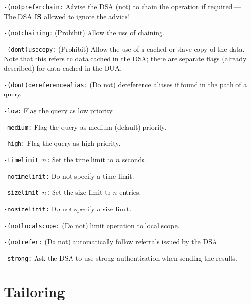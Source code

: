 \begin{describe}

\item [\tt -(no)preferchain\rm :] Advise the DSA (not) to chain the operation if
required --- The DSA {\bf IS} allowed to ignore the advice!

\item [\tt -(no)chaining\rm :] (Prohibit) Allow the use of chaining.

\item [\tt -(dont)usecopy\rm :] (Prohibit) Allow the use of a cached or slave 
copy of the data.  
Note that this refers to data cached in the DSA; there are separate flags
(already described)
for data cached in the DUA.

\item [\tt -(dont)dereferencealias\rm :] (Do not) dereference aliases if found in
the path of a query.

\item [\tt -low\rm :] Flag the query as low priority.
\item [\tt -medium\rm :] Flag the query as medium (default) priority.
\item [\tt -high\rm :]  Flag the query as high priority.

\item [\tt -timelimit $n$\rm :] Set the time limit to $n$ seconds.
\item [\tt -notimelimit\rm :] Do not specify a time limit.

\item [\tt -sizelimit $n$\rm :] Set the size limit to $n$ entries.
\item [\tt -nosizelimit\rm :] Do not specify a size limit.

\item [\tt -(no)localscope\rm :] (Do not) limit operation to local scope.

\item [\tt -(no)refer\rm :] (Do not) automatically follow referrals issued by the DSA.

\item [\tt -strong\rm :]	Ask the DSA to use strong authentication when sending the
results.

\end{describe}



\section {Tailoring}

